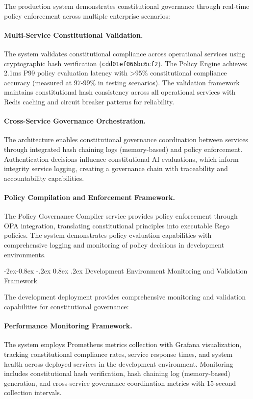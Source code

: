 \documentclass[manuscript,screen,9pt]{acmart}
\makeatletter
\renewcommand\subsubsection{\@startsection{subsubsection}{3}{\z@}%
  {-2ex\@plus -0.8ex \@minus -.2ex}%
  {0.8ex \@plus .2ex}%
  {\normalfont\normalsize\bfseries}}
\makeatother
\begin{document}
The production system demonstrates constitutional governance through real-time policy enforcement across multiple enterprise scenarios:

\paragraph{Multi-Service Constitutional Validation.} The system validates constitutional compliance across operational services using cryptographic hash verification (\texttt{cdd01ef066bc6cf2}). The Policy Engine achieves 2.1ms P99 policy evaluation latency with >95\% constitutional compliance accuracy (measured at 97-99\% in testing scenarios). The validation framework maintains constitutional hash consistency across all operational services with Redis caching and circuit breaker patterns for reliability.

\paragraph{Cross-Service Governance Orchestration.} The architecture enables constitutional governance coordination between services through integrated hash chaining logs (memory-based) and policy enforcement. Authentication decisions influence constitutional AI evaluations, which inform integrity service logging, creating a governance chain with traceability and accountability capabilities.

\paragraph{Policy Compilation and Enforcement Framework.} The Policy Governance Compiler service provides policy enforcement through OPA integration, translating constitutional principles into executable Rego policies. The system demonstrates policy evaluation capabilities with comprehensive logging and monitoring of policy decisions in development environments.

\subsubsection{Development Environment Monitoring and Validation Framework}
\label{subsubsec:production_monitoring}

The development deployment provides comprehensive monitoring and validation capabilities for constitutional governance:

\paragraph{Performance Monitoring Framework.} The system employs Prometheus metrics collection with Grafana visualization, tracking constitutional compliance rates, service response times, and system health across deployed services in the development environment. Monitoring includes constitutional hash verification, hash chaining log (memory-based) generation, and cross-service governance coordination metrics with 15-second collection intervals.
\end{document}
